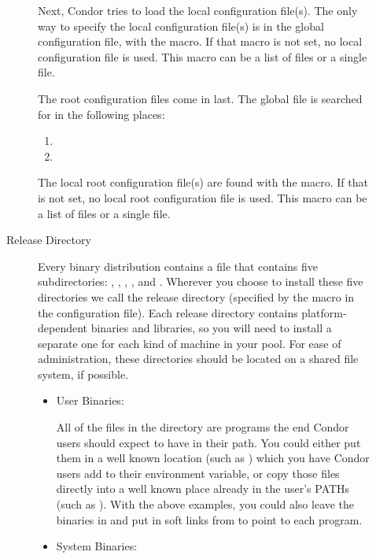 \begin{description}
\begin{description}
Next, Condor tries to load the local configuration file(s).
The only way to specify the local configuration file(s) is in the global configuration
file, with the  macro.  If that macro is not
set, no local configuration file is used.  This macro can be a list of files
or a single file.

The root configuration files come in last.  The global file is searched for
in the following places:
\begin{enumerate}
   \item {}
   \item {}
\end{enumerate}

The local root configuration file(s) are found with the
 macro.  If that is not set, no local
root configuration file is used.  This
macro can be a list of files or a single file.

\item[Release Directory]

Every binary distribution contains a  file that contains
five subdirectories: , , , ,
and . Wherever you
choose to install these five directories we call the release directory
(specified by the  macro in the configuration file).
Each
release directory contains platform-dependent binaries and libraries,
so you will need to install a separate one for each kind of machine in
your pool.  For ease of administration, these directories should be
located on a shared file system, if possible.

\begin{itemize}
     \item User Binaries:

     All of the files in the  directory are programs the end
     Condor users should expect to have in their path.  You could
     either put them in a well known location (such as
     ) which you have Condor users add to
     their  environment variable, or copy those files
     directly into a well known place already in the user's PATHs (such as
     ).  With the above examples, you could also
     leave the binaries in  and put in
     soft links from  to point to each program.

     \item System Binaries:


\end{itemize}
\end{description}
\end{description}

